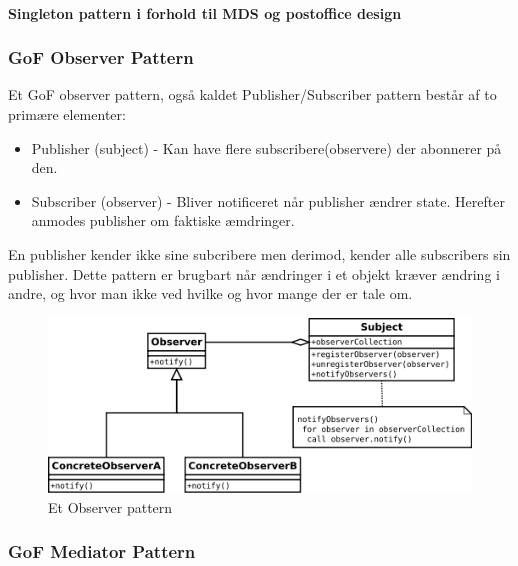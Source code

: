 \paragraph{Singleton pattern i forhold til MDS og postoffice design}

\subsubsection{GoF Observer Pattern}

Et GoF observer pattern, også kaldet Publisher/Subscriber pattern består af to primære elementer:

\begin{itemize}
	\item Publisher (subject) - Kan have flere subscribere(observere) der abonnerer på den.
	\item Subscriber (observer) - Bliver notificeret når publisher ændrer state. Herefter anmodes publisher om faktiske æmdringer.
\end{itemize}
En publisher kender ikke sine subcribere men derimod, kender alle subscribers sin publisher. Dette pattern er brugbart når ændringer i et objekt kræver ændring i andre, og hvor man ikke ved hvilke og hvor mange der er tale om.

\begin{figure}[h]
	\centering
	\includegraphics[width=0.8\linewidth]{figs/spm5/observerUML}
	\caption{Et Observer pattern}
	\label{fig:ObserverPattern}
\end{figure}

\subsubsection{GoF Mediator Pattern}